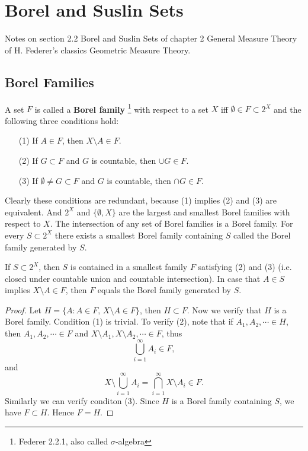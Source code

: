 \chapter{Borel and Suslin Sets}

Notes on section 2.2 Borel and Suslin Sets of chapter 2 General Measure 
Theory of H. Federer's classics Geometric Measure Theory.


\section{Borel Families}

\begin{definition} \label{D:borel_fam}
A set $F$ is called a \textbf{Borel family} 
\footnote{Federer 2.2.1, also called $\sigma$-algebra}
with respect to a set $X$ iff
$\emptyset\in F\subset 2^X$ and the following three conditions hold:
\begin{enumerate}
  \item[(1)] If $A\in F$, then $X\setminus A\in F$.
  \item[(2)] If $G\subset F$ and $G$ is countable, then $\cup G\in F$.
  \item[(3)] If $\emptyset\neq G\subset F$ and $G$ is countable, then $\cap G\in F$.
\end{enumerate}
\end{definition}
Clearly these conditions are redundant, because (1) implies (2) and (3) are
equivalent. And $2^X$ and $\{\emptyset,X\}$ are the largest and smallest Borel
families with respect to $X$. The intersection of any set of Borel families is a
Borel family. For every $S\subset 2^X$ there exists a smallest Borel family
containing $S$ called the Borel family generated by $S$.


\begin{proposition} \label{P:borel1}
If $S\subset 2^X$, then $S$ is contained in a smallest family $F$ satisfying (2)
and (3) (i.e. closed under countable union and countable intersection). In case
that $A\in S$ implies $X\setminus A\in F$, then $F$ equals the Borel family
generated by $S$.
\end{proposition}
\begin{proof}
Let $H=\{A: A\in F,\, X\setminus A\in F\}$, then $H\subset F$. Now we verify 
that $H$ is a Borel family. Condition (1) is trivial. To verify (2), note that 
if $A_1, A_2, \cdots\in H$, then $A_1,A_2,\cdots\in F$ and 
$X\setminus A_1,X\setminus A_2,\cdots\in F$, thus
\[
  \bigcup_{i=1}^{\infty}A_i \in F,
\]
and 
\[
  X\setminus \bigcup_{i=1}^{\infty} A_i 
    = \bigcap_{i=1}^{\infty} X\setminus A_i \in F.
\]
Similarly we can verify conditon (3). Since $H$ is a Borel family containing
$S$, we have $F\subset H$. Hence $F=H$.
\end{proof}


